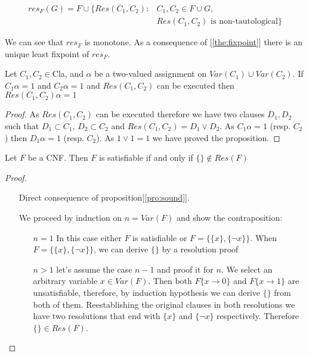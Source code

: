 \begin{equation}
  \begin{split}
    res_F(G) = F \cup \{Res(C_1,C_2) : &C_1,C_2 \in F \cup G, \\ & Res(C_1,C_2) \text{ is non-tautological}\}
  \end{split}
\end{equation}


We can see that $res_F$ is monotone. As a consequence of [\ref{the:fixpoint}] there is an unique least fixpoint of $res_F$.

\begin{proposition} \label{pro:sound}
  Let $C_1, C_2 \in $Cla, and $\alpha$ be a two-valued assignment on $Var(C_1)\cup Var(C_2)$. If $C_1 \alpha = 1$ and $C_2 \alpha = 1$ and $Res(C_1,C_2)$ can be executed then $Res(C_1,C_2) \alpha = 1$
\end{proposition}
\begin{proof}
As $Res(C_1,C_2)$ can be executed therefore we have two clauses $D_1,D_2$ such that $D_1 \subset C_1$, $D_2 \subset C_2$ and $Res(C_1,C_2) = D_1\vee D_2$. As $C_1\alpha = 1$ (resp. $C_2$) then $D_1\alpha = 1$ (resp. $C_2$). As $1 \vee 1=1$ we have proved the proposition.
\end{proof}


\begin{theorem}
Let $F$ be a CNF. Then $F$ is satisfiable if and only if $\{\} \not\in Res(F)$
\end{theorem}
\begin{proof}\hfill
  \begin{itemize}\item[\fbox{$\Rightarrow$}] Direct consequence of proposition[\ref{pro:sound}].
  \item[\fbox{$\Leftarrow$}] We proceed by induction on $n = Var(F)$ and show the contraposition:
    \begin{itemize}
    \item[$n=1$] In this case either $F$ is satisfiable or $F = \{\{x\},\{\neg x\}\}$.  When $F = \{\{x\},\{\neg x\}\}$, we can derive $\{\}$ by a resolution proof
      
    \item[$n>1$] let's assume the case $n-1$ and proof it for $n$. We select an arbitrary variable $x\in Var(F)$. Then both $F\{x\to 0\}$ and  $F\{x\to 1\}$ are unsatisfiable, therefore, by induction hypothesis we can derive $\{\}$ from both of them. Reestablishing the original clauses in both resolutions we have two resolutions that end with $\{x\}$ and $\{\neg x\}$ respectively. Therefore $\{\} \in Res(F)$.
    \end{itemize}
  \end{itemize}
\end{proof}

